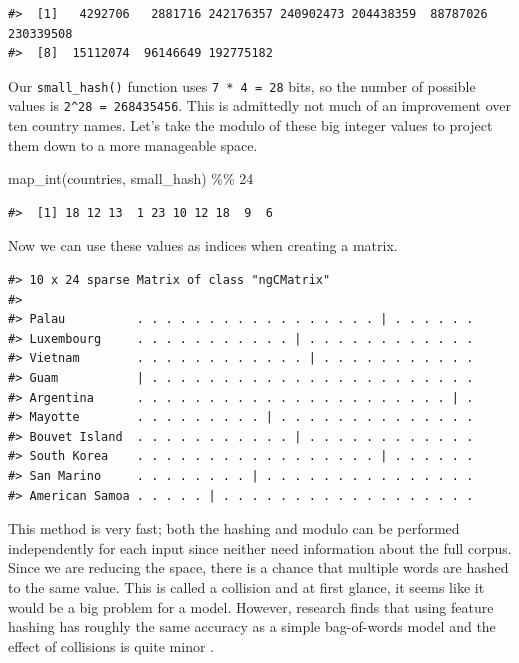\documentclass[
]{krantz}
\makeatletter
\newenvironment{Shaded}{\begin{snugshade}}{\end{snugshade}}
\newcommand{\DecValTok}[1]{\textcolor[rgb]{0.00,0.00,0.81}{#1}}
\newcommand{\FunctionTok}[1]{\textcolor[rgb]{0.00,0.00,0.00}{#1}}
\newcommand{\NormalTok}[1]{#1}
\newcommand{\SpecialCharTok}[1]{\textcolor[rgb]{0.00,0.00,0.00}{#1}}
\newenvironment{kframe}{%
\medskip{}
\setlength{\fboxsep}{.8em}
 \def\at@end@of@kframe{}%
 \ifinner\ifhmode%
  \def\at@end@of@kframe{\end{minipage}}%
  \begin{minipage}{\columnwidth}%
 \fi\fi%
 \def\FrameCommand##1{\hskip\@totalleftmargin \hskip-\fboxsep
 \colorbox{shadecolor}{##1}\hskip-\fboxsep
     \hskip-\linewidth \hskip-\@totalleftmargin \hskip\columnwidth}%
 \MakeFramed {\advance\hsize-\width
   \@totalleftmargin\z@ \linewidth\hsize
   \@setminipage}}%
 {\par\unskip\endMakeFramed%
 \at@end@of@kframe}
\renewenvironment{Shaded}{\begin{kframe}}{\end{kframe}}
\makeatother
\begin{document}
\begin{verbatim}
#>  [1]   4292706   2881716 242176357 240902473 204438359  88787026 230339508
#>  [8]  15112074  96146649 192775182
\end{verbatim}

Our \texttt{small\_hash()} function uses \texttt{7\ *\ 4\ =\ 28} bits, so the number of possible values is \texttt{2\^{}28\ =\ 268435456}. This is admittedly not much of an improvement over ten country names.
Let's take the modulo of these big integer values to project them down to a more manageable space.

\begin{Shaded}
\begin{Highlighting}[]
\FunctionTok{map\_int}\NormalTok{(countries, small\_hash) }\SpecialCharTok{\%\%} \DecValTok{24}
\end{Highlighting}
\end{Shaded}

\begin{verbatim}
#>  [1] 18 12 13  1 23 10 12 18  9  6
\end{verbatim}

Now we can use these values as indices when creating a matrix.

\begin{verbatim}
#> 10 x 24 sparse Matrix of class "ngCMatrix"
#>                                                               
#> Palau          . . . . . . . . . . . . . . . . . | . . . . . .
#> Luxembourg     . . . . . . . . . . . | . . . . . . . . . . . .
#> Vietnam        . . . . . . . . . . . . | . . . . . . . . . . .
#> Guam           | . . . . . . . . . . . . . . . . . . . . . . .
#> Argentina      . . . . . . . . . . . . . . . . . . . . . . | .
#> Mayotte        . . . . . . . . . | . . . . . . . . . . . . . .
#> Bouvet Island  . . . . . . . . . . . | . . . . . . . . . . . .
#> South Korea    . . . . . . . . . . . . . . . . . | . . . . . .
#> San Marino     . . . . . . . . | . . . . . . . . . . . . . . .
#> American Samoa . . . . . | . . . . . . . . . . . . . . . . . .
\end{verbatim}

This method is very fast; both the hashing and modulo can be performed independently for each input since neither need information about the full corpus.
Since we are reducing the space, there is a chance that multiple words are hashed to the same value.
This is called a collision and at first glance, it seems like it would be a big problem for a model.
However, research finds that using feature hashing has roughly the same accuracy as a simple bag-of-words model and the effect of collisions is quite minor \citep{Forman2008}.
\end{document}
